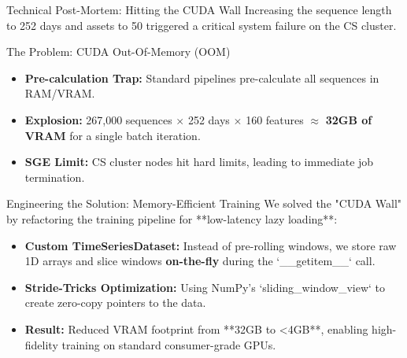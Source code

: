 \begin{frame}{Technical Post-Mortem: Hitting the CUDA Wall}
    Increasing the sequence length to 252 days and assets to 50 triggered a critical system failure on the CS cluster.
    \begin{alertblock}{The Problem: CUDA Out-Of-Memory (OOM)}
        \begin{itemize}
            \item \textbf{Pre-calculation Trap:} Standard pipelines pre-calculate all sequences in RAM/VRAM.
            \item \textbf{Explosion:} 267,000 sequences $\times$ 252 days $\times$ 160 features $\approx$ \textbf{32GB of VRAM} for a single batch iteration.
            \item \textbf{SGE Limit:} CS cluster nodes hit hard limits, leading to immediate job termination.
        \end{itemize}
    \end{alertblock}
\end{frame}

\begin{frame}{Engineering the Solution: Memory-Efficient Training}
    We solved the "CUDA Wall" by refactoring the training pipeline for **low-latency lazy loading**:
    \begin{itemize}
        \item \textbf{Custom TimeSeriesDataset:} Instead of pre-rolling windows, we store raw 1D arrays and slice windows \textbf{on-the-fly} during the `__getitem__` call.
        \item \textbf{Stride-Tricks Optimization:} Using NumPy's `sliding_window_view` to create zero-copy pointers to the data.
        \item \textbf{Result:} Reduced VRAM footprint from **32GB to <4GB**, enabling high-fidelity training on standard consumer-grade GPUs.
    \end{itemize}
\end{frame}

